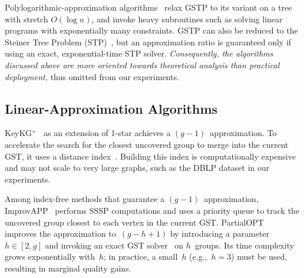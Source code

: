 Polylogarithmic-approximation algorithms~\cite{PolyAppr_1, PolyAppr_2} relax GSTP to its variant on a tree with stretch $O(\log n)$, and invoke heavy subroutines such as solving linear programs with exponentially many constraints. 
GSTP can also be reduced to the Steiner Tree Problem (STP)~\cite{ST_noappr}, but an approximation ratio is guaranteed only if using an exact, exponential-time STP solver.
\emph{Consequently, the algorithms discussed above are more oriented towards theoretical analysis than practical deployment,} thus omitted from our experiments.

\subsection{Linear-Approximation Algorithms}
\label{subsec: line-alg}


KeyKG$^+$~\cite{KeyKG} as an extension of 1-star achieves a $(g-1)$~approximation. To accelerate the search for the closest uncovered group to merge into the current GST, it uses a distance index~\cite{PLL}.
Building this index is computationally expensive and may not scale to very large graphs, such as the DBLP dataset in our experiments.

Among index-free methods that guarantee a $(g-1)$~approximation, ImprovAPP~\cite{ImprovAPP} performs SSSP computations and uses a priority queue to track the uncovered group closest to each vertex in the current GST. PartialOPT~\cite{ImprovAPP} improves the approximation to~$(g-h+1)$ by introducing a parameter $h \in [2,g]$ and invoking an exact GST solver~\cite{KS_5} on $h$~groups. Its time complexity grows exponentially with~$h$; in practice, a small~$h$ (e.g.,~$h=3$) must be used, resulting in marginal quality gains.

